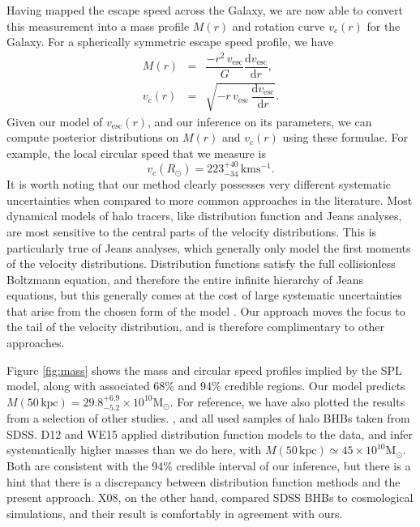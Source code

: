 \documentclass[useAMS,twocolumn,usenatbib]{mn2e}
\def\kpc{{\,\mathrm{kpc}}}
\def\kms{{\,\mathrm{kms^{-1}}}}
\def\vesc{{v_\mathrm{esc}}}
\begin{document}
Having mapped the escape speed across the Galaxy, we are now able to convert this 
measurement into a mass profile $M(r)$ and rotation curve $v_c(r)$ for the Galaxy. For a spherically 
symmetric escape speed profile, we have
%
\begin{eqnarray}
M(r) &=& \dfrac{-r^2\,\vesc}{G}\dfrac{\mathrm{d}\vesc}{\mathrm{d}r}, \label{eq:mass}\\
v_c(r) &=& \sqrt{-r\,\vesc\,\dfrac{\mathrm{d}\vesc}{\mathrm{d}r}}. \label{eq:circspeed}
\end{eqnarray}
%
Given our model of $\vesc(r)$, and our inference on its parameters, we can compute posterior 
distributions on $M(r)$ and $v_c(r)$ using these formulae. For example, the local circular speed 
that we measure is
%
\begin{equation}
v_c(R_\odot) = 223^{+40}_{-34}\kms.
\end{equation}
%
It is worth noting that our method clearly possesses very different systematic uncertainties when compared to more 
common approaches in the literature. Most dynamical models of halo tracers, like distribution function 
and Jeans analyses, are most sensitive to the central parts of the velocity distributions.
This is particularly true of Jeans analyses, which generally only model the first moments of 
the velocity distributions. Distribution functions satisfy the full collisionless Boltzmann equation, 
and therefore the entire infinite hierarchy of Jeans equations, but this generally comes at the 
cost of large systematic uncertainties that arise from the chosen form of the model \citep{Wa15}. 
Our approach moves the focus to the tail of the velocity distribution, and is therefore complimentary 
to other approaches.

Figure \ref{fig:mass} shows the mass and circular speed profiles implied by the SPL model, along with 
associated 68\% and 94\% credible regions. Our model predicts $M(50\kpc)=29.8^{+6.9}_{-5.2}
\times 10^{10}\mathrm{M}_\odot$. For reference, we have also plotted the results from 
a selection of other studies. \citet[][X08]{Xu08}, \citet[][D12]{De12} and \citet[][WE15]{Wi15} all used 
samples of halo BHBs taken from SDSS. D12 and WE15 applied distribution function models to the data, and 
infer systematically higher masses than we do here, with $M(50\kpc) \simeq 45\times10^{10}\mathrm{M}_\odot$. 
Both are consistent with the 94\% credible interval of our inference, but there is a hint that there 
is a discrepancy between distribution function methods and the present approach. X08, on the other hand, 
compared SDSS BHBs to cosmological simulations, and their result is comfortably in agreement with ours.
\end{document}
